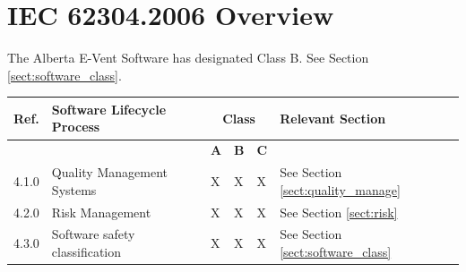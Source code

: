 \documentclass[]{article}
\begin{document}
\clearpage


\section{IEC 62304.2006 Overview}

The Alberta E-Vent Software has designated Class B. See Section \ref{sect:software_class}.

\begin{center}
	\begin{longtable}{ |p{1.3cm}| p{5.5cm}| p{0.7cm}| p{0.7cm}| p{0.7cm}| p{3.5cm}| }
	\hline
	\rowcolor{blue!25} \textbf{Ref.} & \textbf{Software Lifecycle Process} & \multicolumn{3}{c|}{\textbf{Class}} & \textbf{Relevant Section}  \\ \hline
	\rowcolor{blue!25} &  & \textbf{A} & \textbf{B} & \textbf{C} &  \\ \hline
	4.1.0 & Quality Management Systems & X & X & X & See Section \ref{sect:quality_manage}  \\ \hline
	4.2.0 & Risk Management & X & X & X & See Section \ref{sect:risk} \\ \hline
	4.3.0 & Software safety classification  & X & X & X & See Section \ref{sect:software_class} \\ \hline
	

\end{longtable}
\end{center}
\end{document}
